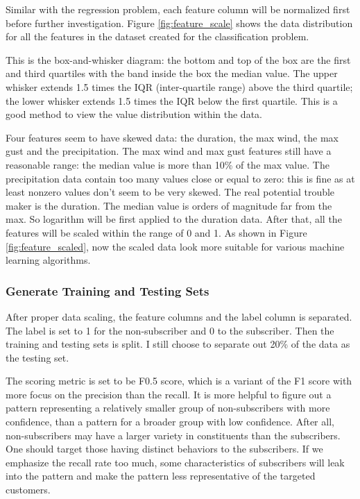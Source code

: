 \documentclass[a4paper]{article}
\begin{document}
			Similar with the regression problem, each feature column will be normalized first before further investigation. Figure \ref{fig:feature_scale} shows the data distribution for all the features in the dataset created for the classification problem.
			
	 		This is the box-and-whisker diagram: the bottom and top of the box are the first and third quartiles with the band inside the box the median value. The upper whisker extends 1.5 times the IQR (inter-quartile range) above the third quartile; the lower whisker extends 1.5 times the IQR below the first quartile. This is a good method to view the value distribution within the data.
			 
			Four features seem to have skewed data: the duration, the max wind, the max gust and the precipitation. The max wind and max gust features still have a reasonable range: the median value is more than 10\% of the max value. The precipitation data contain too many values close or equal to zero: this is fine as at least nonzero values don't seem to be very skewed. The real potential trouble maker is the duration. The median value is orders of magnitude far from the max. So logarithm will be first applied to the duration data. After that, all the features will be scaled within the range of 0 and 1. As shown in Figure \ref{fig:feature_scaled}, now the scaled data look more suitable for various machine learning algorithms.
			
			\subsubsection{Generate Training and Testing Sets}
			After proper data scaling, the feature columns and the label column is separated. The label is set to 1 for the non-subscriber and 0 to the subscriber. Then the training and testing sets is split. I still choose to separate out 20\% of the data as the testing set. 
			
			The scoring metric is set to be F0.5 score, which is a variant of the F1 score with more focus on the precision than the recall. It is more helpful to figure out a pattern representing a relatively smaller group of non-subscribers with more confidence, than a pattern for a broader group with low confidence. After all, non-subscribers may have a larger variety in constituents than the subscribers. One should target those having distinct behaviors to the subscribers. If we emphasize the recall rate too much, some characteristics of subscribers will leak into the pattern and make the pattern less representative of the targeted customers.
			
\end{document}

